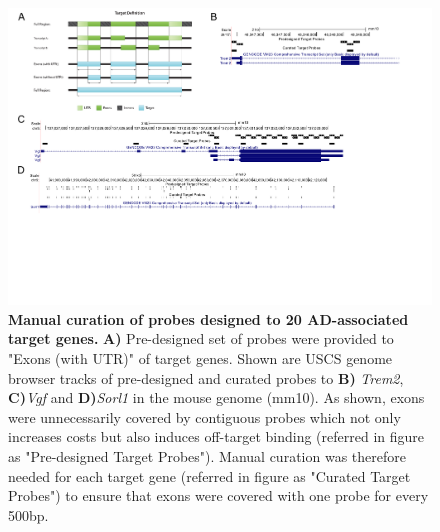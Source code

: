 \begin{landscape}
	\begin{figure}[!ht]
		\begin{center}
			\includegraphics[page=1,trim={0cm 10cm 0cm 0cm},clip,scale = 0.90]{Figures/TargetProbes_Visualisation.pdf}
		\end{center}
		\captionsetup{width=1.5\textwidth}
		\caption[Manual curation of probes designed to 20 AD-associated target genes]%
		{\textbf{Manual curation of probes designed to 20 AD-associated target genes.} \textbf{A)} Pre-designed set of probes were provided to "Exons (with UTR)" of target genes. Shown are USCS genome browser tracks of pre-designed and curated probes to \textbf{B)} \textit{Trem2}, \textbf{C)}\textit{Vgf} and \textbf{D)}\textit{Sorl1} in the mouse genome (mm10). As shown, exons were unnecessarily covered by contiguous probes which not only increases costs but also induces off-target binding (referred in figure as "Pre-designed Target Probes"). Manual curation was therefore needed for each target gene (referred in figure as "Curated Target Probes") to ensure that exons were covered with one probe for every 500bp. }
		\label{fig:target_probes_eg}
	\end{figure}
\end{landscape}

